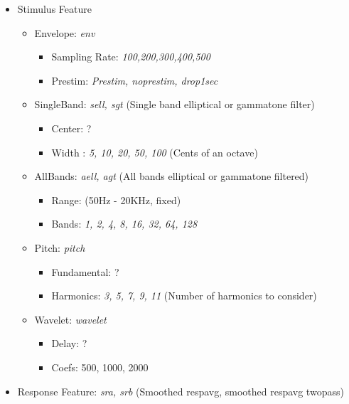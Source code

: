 \documentclass[11pt]{article}
\begin{document}
\begin{itemize}
\item Stimulus Feature

\begin{itemize}
\item Envelope: \emph{env}

\begin{itemize}
\item Sampling Rate: \emph{100,200,300,400,500}
\item Prestim: \emph{Prestim, noprestim, drop1sec}
\end{itemize}

\item SingleBand: \emph{sell, sgt} (Single band elliptical or gammatone filter)

\begin{itemize}
\item Center: ?
\item Width : \emph{5, 10, 20, 50, 100} (Cents of an octave)
\end{itemize}

\item AllBands: \emph{aell, agt} (All bands elliptical or gammatone filtered)

\begin{itemize}
\item Range: (50Hz - 20KHz, fixed)
\item Bands: \emph{1, 2, 4, 8, 16, 32, 64, 128}
\end{itemize}

\item Pitch: \emph{pitch}

\begin{itemize}
\item Fundamental: ?
\item Harmonics: \emph{3, 5, 7, 9, 11} (Number of harmonics to consider)
\end{itemize}

\item Wavelet: \emph{wavelet}

\begin{itemize}
\item Delay: ?
\item Coefs: 500, 1000, 2000
\end{itemize}

\end{itemize}

\item Response Feature: \emph{sra, srb} (Smoothed respavg, smoothed respavg twopass)


\end{itemize}
\end{document}
